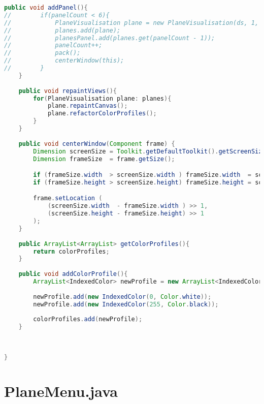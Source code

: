 \documentclass[pdftex,a4paper,10pt,titlepage]{article}
\begin{document}
\begin{lstlisting}[language=java, breaklines=true]
    public void addPanel(){
//        if(panelCount < 6){
//            PlaneVisualisation plane = new PlaneVisualisation(ds, 1, colorProfiles);
//            planes.add(plane);
//            planesPanel.add(planes.get(panelCount - 1));
//            panelCount++;
//            pack();
//            centerWindow(this);
//        }
    }
    
    public void repaintViews(){
        for(PlaneVisualisation plane: planes){
            plane.repaintCanvas();
            plane.refactorColorProfiles();
        }
    }
    
    public void centerWindow(Component frame) {
        Dimension screenSize = Toolkit.getDefaultToolkit().getScreenSize();
        Dimension frameSize  = frame.getSize();

        if (frameSize.width  > screenSize.width ) frameSize.width  = screenSize.width;
        if (frameSize.height > screenSize.height) frameSize.height = screenSize.height;

        frame.setLocation (
            (screenSize.width  - frameSize.width ) >> 1, 
            (screenSize.height - frameSize.height) >> 1
        );
    }
    
    public ArrayList<ArrayList> getColorProfiles(){
        return colorProfiles;
    }
    
    public void addColorProfile(){
        ArrayList<IndexedColor> newProfile = new ArrayList<IndexedColor>();
        
        newProfile.add(new IndexedColor(0, Color.white));
        newProfile.add(new IndexedColor(255, Color.black));
        
        colorProfiles.add(newProfile);
    }
            
    
    
}

\end{lstlisting}


\section{PlaneMenu.java}
\end{document}
